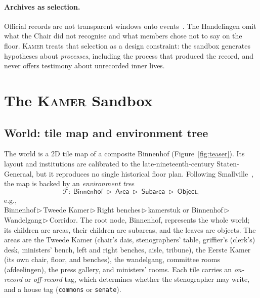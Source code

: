 \documentclass[sigconf,review,anonymous]{acmart}
\newcommand{\sys}{\textsc{Kamer}}
\begin{document}
\paragraph{Archives as selection.} Official records are not transparent
windows onto events~\cite{trouillot1995silencing}. The Handelingen omit
what the Chair did not recognise and what members chose not to say on the
floor. \sys{} treats that selection as a design constraint: the sandbox
generates hypotheses about \emph{processes}, including the process that
produced the record, and never offers testimony about unrecorded inner
lives.

\section{The \sys{} Sandbox}
\label{sec:sandbox}

\subsection{World: tile map and environment tree}

The world is a 2D tile map of a composite Binnenhof
(Figure~\ref{fig:teaser}). Its layout and institutions are calibrated to
the late-nineteenth-century Staten-Generaal, but it reproduces no single
historical floor plan. Following Smallville~\cite{park2023generative}, the
map is backed by an \emph{environment tree}
\[
\mathcal{T}:\ \textsf{Binnenhof}\ \triangleright\ \textsf{Area}\ \triangleright\
\textsf{Subarea}\ \triangleright\ \textsf{Object},
\]
e.g.,\\ \textsf{Binnenhof\,$\triangleright$\,Tweede Kamer\,$\triangleright$\,Right benches\,$\triangleright$\,kamerstuk}
or
\textsf{Binnenhof\,$\triangleright$\,Wandelgang\,$\triangleright$\,Corridor}.
The root node, Binnenhof, represents the whole world; its children are
areas, their children are subareas, and the leaves are objects. The areas
are the Tweede Kamer (chair's dais, stenographers' table,
griffier's (clerk's) desk, ministers' bench, left and right benches, aisle,
tribune), the Eerste Kamer (its own chair, floor, and benches), the
wandelgang, committee rooms (afdeelingen), the press gallery, and ministers'
rooms. Each tile carries an \emph{on-record} or \emph{off-record} tag,
which determines whether the stenographer may write, and a house tag
(\texttt{commons} or \texttt{senate}).
\end{document}
